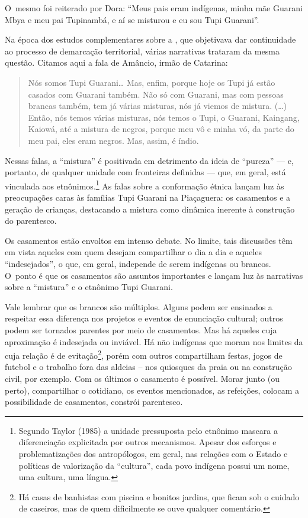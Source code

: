 O~mesmo foi reiterado por Dora: ``Meus pais eram indígenas, minha mãe
Guarani Mbya e meu pai Tupinambá, e aí se misturou e eu sou Tupi
Guarani''.

Na época dos estudos complementares sobre a , que objetivava dar
continuidade ao processo de demarcação territorial, várias narrativas
trataram da mesma questão. Citamos aqui a fala de Amâncio, irmão de
Catarina:

\begin{quote}
\noindent
Nós somos Tupi Guarani\ldots{} Mas, enfim, porque hoje os Tupi já estão
casados com Guarani também. Não só com Guarani, mas com pessoas brancas
também, tem já várias misturas, nós já viemos de mistura. (\ldots{}) Então,
nós temos várias misturas, nós temos o Tupi, o Guarani, Kaingang,
Kaiowá, até a mistura de negros, porque meu vô e minha vó, da parte do
meu pai, eles eram negros. Mas, assim, é índio.
\end{quote} 

Nessas falas, a ``mistura'' é positivada em detrimento da ideia de ``pureza'' ---
e, portanto, de qualquer unidade com fronteiras definidas --- que, em
geral, está vinculada aos etnônimos.\footnote{Segundo Taylor (1985) a
unidade pressuposta pelo etnônimo mascara a diferenciação explicitada
por outros mecanismos. Apesar dos esforços e problematizações dos
antropólogos, em geral, nas relações com o Estado e políticas de
valorização da ``cultura'', cada povo indígena possui um nome, uma
cultura, uma língua.} As falas sobre a conformação étnica lançam luz
às preocupações caras às famílias Tupi Guarani na  Piaçaguera: os
casamentos e a geração de crianças, destacando a mistura como dinâmica
inerente à construção do parentesco.

Os casamentos estão envoltos em intenso debate. No limite, tais
discussões têm em vista aqueles com quem desejam compartilhar o dia a
dia e aqueles ``indesejados'', o que, em geral, independe de serem
indígenas ou brancos. O~ponto é que os casamentos são assuntos
importantes e lançam luz às narrativas sobre a ``mistura'' e o etnônimo
Tupi Guarani.

Vale lembrar que os brancos são múltiplos. Alguns podem ser ensinados a
respeitar essa diferença nos projetos e eventos de enunciação cultural;
outros podem ser tornados parentes por meio de casamentos. Mas há
aqueles cuja aproximação é indesejada ou inviável. Há não indígenas que
moram nos limites da  cuja relação é de evitação\footnote{Há casas de
banhistas com piscina e bonitos jardins, que ficam sob o cuidado de
caseiros, mas de quem dificilmente se ouve qualquer comentário.}, porém
com outros compartilham festas, jogos de futebol e o trabalho fora das
aldeias – nos quiosques da praia ou na construção civil, por exemplo.
Com os últimos o casamento é possível. Morar junto (ou perto),
compartilhar o cotidiano, os eventos mencionados, as refeições, colocam
a possibilidade de casamentos, constrói parentesco. 

